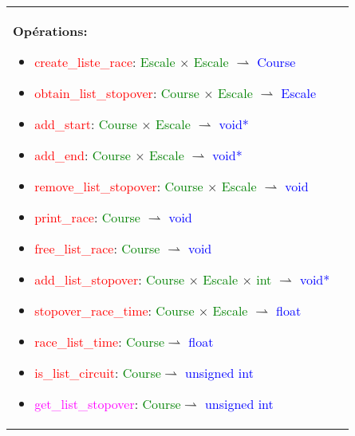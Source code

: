 \documentclass[a4paper, 11pt, oneside]{article}
\begin{document}
\begin{tabular}{|p{17cm}|c}
				\textbf{Opérations\footnotemark{}:}
					\begin{itemize}
						\item[] \textcolor{red}{create\_liste\_race}: \textcolor{green}{Escale} $\times$ \textcolor{green}{Escale} $\rightharpoonup$ \textcolor{blue}{Course}
						\item[] \textcolor{red}{obtain\_list\_stopover}: \textcolor{green}{Course} $\times$ \textcolor{green}{Escale} $\rightharpoonup$ \textcolor{blue}{Escale}
						\item[] \textcolor{red}{add\_start}: \textcolor{green}{Course} $\times$ \textcolor{green}{Escale} $\rightharpoonup$ \textcolor{blue}{void*}
						\item[] \textcolor{red}{add\_end}: \textcolor{green}{Course} $\times$ \textcolor{green}{Escale} $\rightharpoonup$ \textcolor{blue}{void*}
						\item[] \textcolor{red}{remove\_list\_stopover}: \textcolor{green}{Course} $\times$ \textcolor{green}{Escale} $\rightharpoonup$ \textcolor{blue}{void}
						\item[] \textcolor{red}{print\_race}: \textcolor{green}{Course} $\rightharpoonup$ \textcolor{blue}{void}
						\item[] \textcolor{red}{free\_list\_race}: \textcolor{green}{Course} $\rightharpoonup$ \textcolor{blue}{void}
						\item[] \textcolor{red}{add\_list\_stopover}: \textcolor{green}{Course} $\times$ \textcolor{green}{Escale} $\times$ \textcolor{green}{int} $\rightharpoonup$ \textcolor{blue}{void*}
						\item[] \textcolor{red}{stopover\_race\_time}: \textcolor{green}{Course} $\times$ \textcolor{green}{Escale} $\rightharpoonup$ \textcolor{blue}{float}
						\item[] \textcolor{red}{race\_list\_time}: \textcolor{green}{Course}$\rightharpoonup$ \textcolor{blue}{float}
						\item[] \textcolor{red}{is\_list\_circuit}: \textcolor{green}{Course}$\rightharpoonup$ \textcolor{blue}{unsigned int}
						\item[] \textcolor{magenta}{get\_list\_stopover}: \textcolor{green}{Course}$\rightharpoonup$ \textcolor{blue}{unsigned int}
					\end{itemize}


\end{tabular}
\end{document}
